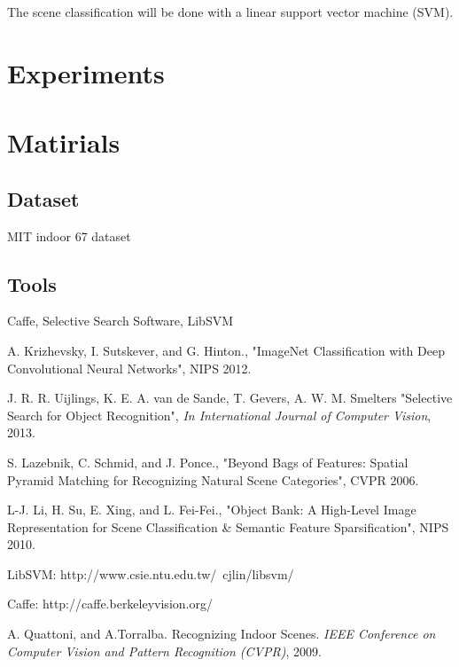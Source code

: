 \documentclass[letterpaper,twocolumn,11pt]{article}
\begin{document}
\par
	The scene classification will be done with a linear support vector machine
	(SVM).\cite{SVM}

\section{Experiments}


\section{Matirials}
	\subsection{Dataset}
	MIT indoor 67 dataset\cite{DATA}

	\subsection{Tools}
	Caffe\cite{CAFFE}, Selective Search Software\cite{SS}, LibSVM\cite{SVM}

\begin{thebibliography}{10}

 A. Krizhevsky, I. Sutskever, and G. Hinton.,
"ImageNet Classification with Deep Convolutional Neural Networks",
NIPS 2012.

 J. R. R. Uijlings, K. E. A. van de Sande,
T. Gevers, A. W. M. Smelters
"Selective Search for Object Recognition",
\emph{In International Journal of Computer Vision}, 2013.

 S. Lazebnik, C. Schmid, and J. Ponce.,
"Beyond Bags of Features:
Spatial Pyramid Matching for Recognizing Natural Scene Categories",
CVPR 2006.

 L-J. Li, H. Su, E. Xing, and L. Fei-Fei.,
"Object Bank: A High-Level Image Representation for Scene Classification
\& Semantic Feature Sparsification",
NIPS 2010.

 LibSVM: http://www.csie.ntu.edu.tw/~cjlin/libsvm/

 Caffe: http://caffe.berkeleyvision.org/

 A. Quattoni, and A.Torralba. Recognizing Indoor Scenes.
\emph{IEEE Conference on Computer Vision and Pattern Recognition (CVPR)},
2009.

\end{thebibliography}
\end{document}
